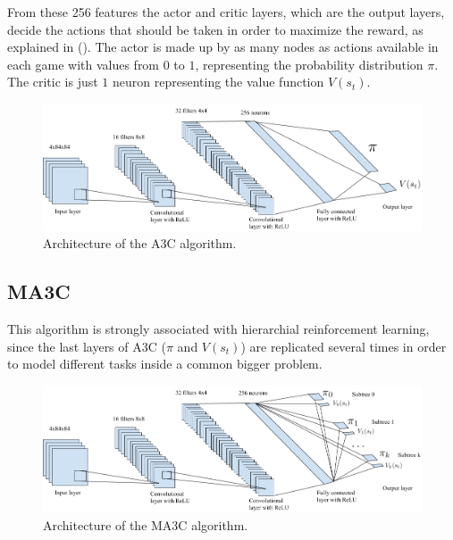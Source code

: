 From these 256 features the actor and critic layers, which are the output layers, decide the actions that should be taken
in order to maximize the reward, as explained in ().
The actor is made up by as many nodes as actions available in each game with values from $0$ to $1$, representing the
probability distribution $\pi$.
The critic is just $1$ neuron representing the value function $V(s_t)$.

\begin{figure}[hbtp]
\begin{center}
\includegraphics[width=430]{img/A3C_architecture.png}
\end{center}
\caption[A3C architecture]
{Architecture of the \ac{A3C} algorithm.}
\label{fig:A3C}
\end{figure}

\subsection{\acl{MA3C}\label{subsec:MA3C}}

This algorithm is strongly associated with hierarchial reinforcement learning, since the last layers of \ac{A3C}
($\pi$ and $V(s_t)$) are replicated several times in order to model different tasks inside a common bigger problem.

\begin{figure}[hbtp]
\begin{center}
\includegraphics[width=430]{img/MA3C_architecture.png}
\end{center}
\caption[MA3C architecture]
{Architecture of the \ac{MA3C} algorithm.}
\label{fig:MA3C}
\end{figure}

